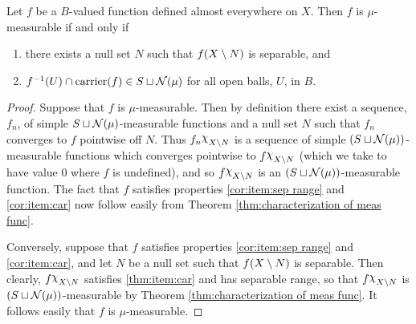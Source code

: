 \begin{corollary}\label{cor:characterization of meas func}
Let $f$ be a $B$-valued function defined almost everywhere on $X$. Then $f$ is $\mu$-measurable if and only if
\begin{enumerate}[label=\arabic*),ref=\arabic*)]
    \item\label{cor:item:sep range}
    there exists a null set $N$ such that $f(X\setminus N)$ is separable, and
    \item\label{cor:item:car}
    $f^{-1}(U)\cap\operatorname{carrier}(f)\in S\sqcup{\cal N}(\mu)$ for all open balls, $U$, in $B$.
\end{enumerate}
\end{corollary}
\begin{proof}
Suppose that $f$ is $\mu$-measurable. Then by definition there exist a sequence, $f_n$, of simple $S\sqcup{\cal N}(\mu)$-measurable functions and a null set $N$ such that $f_n$ converges to $f$ pointwise off $N$. Thus $f_n\idf{X\sd N}$ is a sequence of simple $(S\sqcup{\cal N}(\mu))$-measurable functions which converges pointwise to $f\idf{X\sd N}$ (which we take to have value 0 where $f$ is undefined), and so $f\idf{X\sd N}$ is an $(S\sqcup{\cal N}(\mu))$-measurable function. The fact that $f$ satisfies properties \ref{cor:item:sep range} and \ref{cor:item:car} now follow easily from Theorem \ref{thm:characterization of meas func}.

Conversely, suppose that $f$ satisfies properties \ref{cor:item:sep range} and \ref{cor:item:car}, and let $N$ be a null set such that $f(X\setminus N)$ is separable. Then clearly, $f\idf{X\sd N}$ satisfies \ref{thm:item:car} and has separable range, so that $f\idf{X\sd N}$ is $(S\sqcup{\cal N}(\mu))$-measurable by Theorem \ref{thm:characterization of meas func}. It follows easily that $f$ is $\mu$-measurable.
\end{proof}

